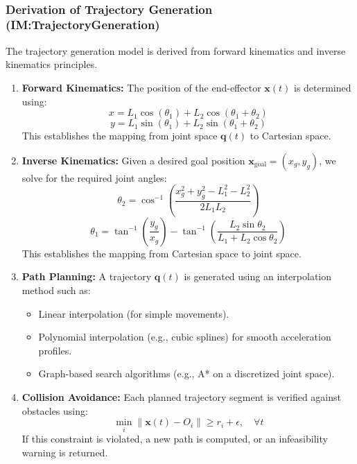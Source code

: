 \documentclass[12pt]{article}
\begin{document}
~\newline



\subsubsection*{Derivation of Trajectory Generation (IM:TrajectoryGeneration)}

The trajectory generation model is derived from forward kinematics and inverse kinematics principles. 

\begin{enumerate}
    \item \textbf{Forward Kinematics:} The position of the end-effector $\mathbf{x}(t)$ is determined using:
    \[
    x = L_1 \cos(\theta_1) + L_2 \cos(\theta_1 + \theta_2)
    \]
    \[
    y = L_1 \sin(\theta_1) + L_2 \sin(\theta_1 + \theta_2)
    \]
    This establishes the mapping from joint space $\mathbf{q}(t)$ to Cartesian space.

    \item \textbf{Inverse Kinematics:} Given a desired goal position $\mathbf{x}_{\text{goal}} = (x_g, y_g)$, we solve for the required joint angles:
    \[
    \theta_2 = \cos^{-1} \left(\frac{x_g^2 + y_g^2 - L_1^2 - L_2^2}{2 L_1 L_2} \right)
    \]
    \[
    \theta_1 = \tan^{-1} \left(\frac{y_g}{x_g} \right) - \tan^{-1} \left(\frac{L_2 \sin \theta_2}{L_1 + L_2 \cos \theta_2} \right)
    \]
    This establishes the mapping from Cartesian space to joint space.

    \item \textbf{Path Planning:} A trajectory $\mathbf{q}(t)$ is generated using an interpolation method such as:
    \begin{itemize}
        \item Linear interpolation (for simple movements).
        \item Polynomial interpolation (e.g., cubic splines) for smooth acceleration profiles.
        \item Graph-based search algorithms (e.g., A* on a discretized joint space).
    \end{itemize}

    \item \textbf{Collision Avoidance:} Each planned trajectory segment is verified against obstacles using:
    \[
    \min\limits_{i} \left\| \mathbf{x}(t) - O_i \right\| \geq r_i + \epsilon, \quad \forall t
    \]
    If this constraint is violated, a new path is computed, or an infeasibility warning is returned.
\end{enumerate}
\end{document}
